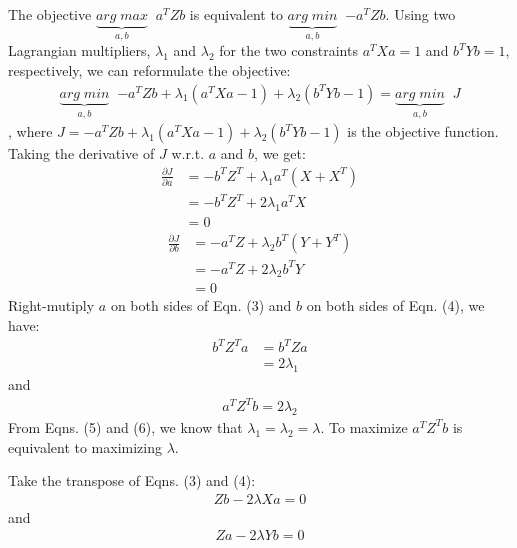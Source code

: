 \documentclass[11pt]{article}
\begin{document}
The objective $\underbrace{arg\;max}_{a,b}\;\;{a^TZb}$ is equivalent to $\underbrace{arg\;min}_{a,b}\;\;{-a^TZb}$. Using two Lagrangian multipliers, $\lambda_1$ and $\lambda_2$ for the two constraints $a^TXa =1$ and $b^TYb =1$, respectively, we can reformulate the objective:
\begin{equation}
	\begin{aligned}
	\underbrace{arg\;min}_{a,b}\;\;{-a^TZb+\lambda_1(a^TXa-1)+\lambda_2(b^TYb-1)}=\underbrace{arg\;min}_{a,b}\;\;{J}
	\end{aligned}
\end{equation}, where $J=-a^TZb+\lambda_1(a^TXa-1)+\lambda_2(b^TYb-1)$ is the objective function.
Taking the derivative of $J$ w.r.t. $a$ and $b$, we get:
\begin{equation}
	\begin{aligned}
		\frac{\partial{J}}{\partial{a}} &= -b^TZ^T+\lambda_1a^T(X+X^T) \\
		&=-b^TZ^T+2\lambda_1a^TX \\
		&= 0
	\end{aligned}
\end{equation}
\begin{equation}
	\begin{aligned}
		\frac{\partial{J}}{\partial{b}} &= -a^TZ+\lambda_2b^T(Y+Y^T) \\
		&=-a^TZ+2\lambda_2b^TY\\
		&= 0
	\end{aligned}
\end{equation}
Right-mutiply $a$ on both sides of Eqn. (3) and $b$ on both sides of Eqn. (4), we have:
\begin{equation}
	\begin{aligned}
		b^TZ^Ta&=b^TZa\\
		&=2\lambda_1
	\end{aligned}
\end{equation}
and 
\begin{equation}
	\begin{aligned}
		a^TZ^Tb=2\lambda_2
	\end{aligned}
\end{equation}
From Eqns. (5) and (6), we know that $\lambda_1=\lambda_2=\lambda$. To maximize $a^TZ^Tb$ is equivalent to maximizing $\lambda$.

Take the transpose of Eqns. (3) and (4): 
\begin{equation}
	\begin{aligned}
		Zb-2\lambda Xa=0
	\end{aligned}
\end{equation}
and 
\begin{equation}
	\begin{aligned}
		Za-2\lambda Yb=0
	\end{aligned}
\end{equation}
\end{document}
